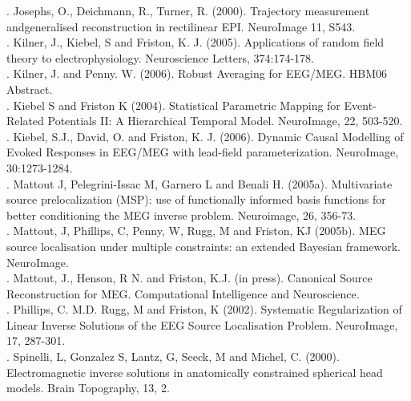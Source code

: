 . Josephs, O., Deichmann, R., Turner, R. (2000). Trajectory measurement andgeneralised reconstruction in rectilinear EPI. NeuroImage 11, S543.\\

. Kilner, J., Kiebel, S and Friston, K. J. (2005). Applications of random field theory to electrophysiology. Neuroscience Letters, 374:174-178.\\

. Kilner, J. and Penny. W. (2006). Robust Averaging for EEG/MEG. HBM06 Abstract.\\

. Kiebel S and Friston K (2004). Statistical Parametric Mapping for Event-Related Potentials II: A Hierarchical Temporal Model. NeuroImage, 22, 503-520.\\

. Kiebel, S.J., David, O. and Friston, K. J. (2006). Dynamic Causal Modelling of Evoked Responses in EEG/MEG with lead-field parameterization. NeuroImage, 30:1273-1284.\\

. Mattout J, Pelegrini-Issac M, Garnero L and Benali H. (2005a). Multivariate source prelocalization (MSP): use of functionally informed basis functions for better conditioning the MEG inverse problem. Neuroimage, 26, 356-73.\\

. Mattout, J, Phillips, C, Penny, W, Rugg, M and Friston, KJ (2005b). MEG source localisation under multiple constraints: an extended Bayesian framework. NeuroImage.\\

. Mattout, J., Henson, R N. and Friston, K.J. (in press). Canonical Source Reconstruction for MEG. Computational Intelligence and Neuroscience.\\

. Phillips, C. M.D. Rugg, M and Friston, K (2002). Systematic Regularization of Linear Inverse Solutions of the EEG Source Localisation Problem. NeuroImage, 17, 287-301.\\

. Spinelli, L, Gonzalez S, Lantz, G, Seeck, M and Michel, C. (2000). Electromagnetic inverse solutions in anatomically constrained spherical head models. Brain Topography, 13, 2.\\

